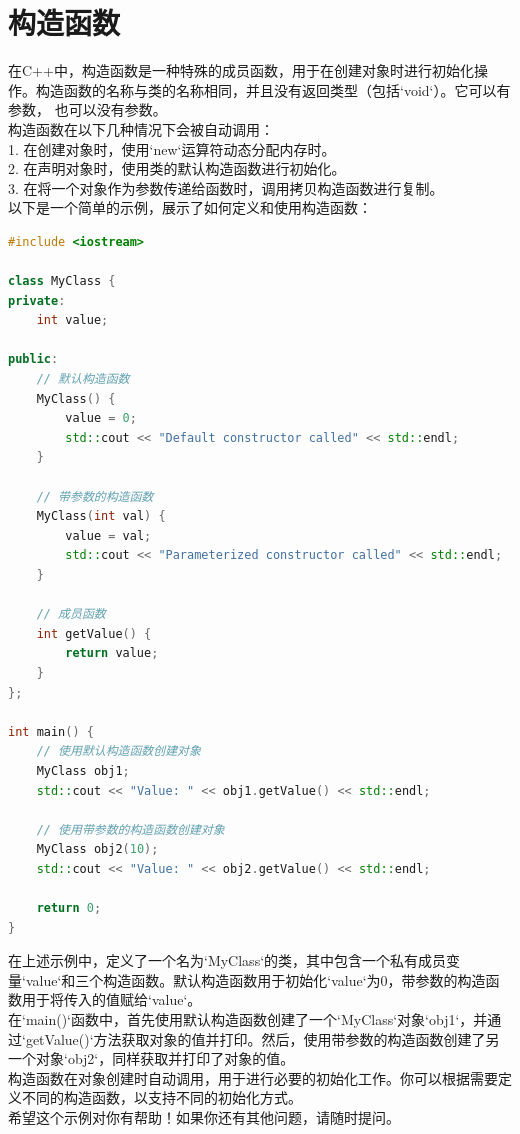 \documentclass[12pt,twiside,a4paper]{ctexbook}
\numberwithin{chapter}{part}
\begin{document}
\section{构造函数}
在C++中，构造函数是一种特殊的成员函数，用于在创建对象时进行初始化操作。构造函数的名称与类的名称相同，并且没有返回类型（包括`void`）。它可以有参数，
也可以没有参数。\\
构造函数在以下几种情况下会被自动调用：\\
1. 在创建对象时，使用`new`运算符动态分配内存时。\\
2. 在声明对象时，使用类的默认构造函数进行初始化。\\
3. 在将一个对象作为参数传递给函数时，调用拷贝构造函数进行复制。\\
以下是一个简单的示例，展示了如何定义和使用构造函数：
\begin{lstlisting}[language=C++]
#include <iostream>

class MyClass {
private:
    int value;

public:
    // 默认构造函数
    MyClass() {
        value = 0;
        std::cout << "Default constructor called" << std::endl;
    }

    // 带参数的构造函数
    MyClass(int val) {
        value = val;
        std::cout << "Parameterized constructor called" << std::endl;
    }

    // 成员函数
    int getValue() {
        return value;
    }
};

int main() {
    // 使用默认构造函数创建对象
    MyClass obj1;
    std::cout << "Value: " << obj1.getValue() << std::endl;

    // 使用带参数的构造函数创建对象
    MyClass obj2(10);
    std::cout << "Value: " << obj2.getValue() << std::endl;

    return 0;
}
\end{lstlisting}
在上述示例中，定义了一个名为`MyClass`的类，其中包含一个私有成员变量`value`和三个构造函数。默认构造函数用于初始化`value`为0，带参数的构造函数用于将传入的值赋给`value`。\\
在`main()`函数中，首先使用默认构造函数创建了一个`MyClass`对象`obj1`，并通过`getValue()`方法获取对象的值并打印。然后，使用带参数的构造函数创建了另一个对象`obj2`，同样获取并打印了对象的值。\\
构造函数在对象创建时自动调用，用于进行必要的初始化工作。你可以根据需要定义不同的构造函数，以支持不同的初始化方式。\\
希望这个示例对你有帮助！如果你还有其他问题，请随时提问。
\end{document}
